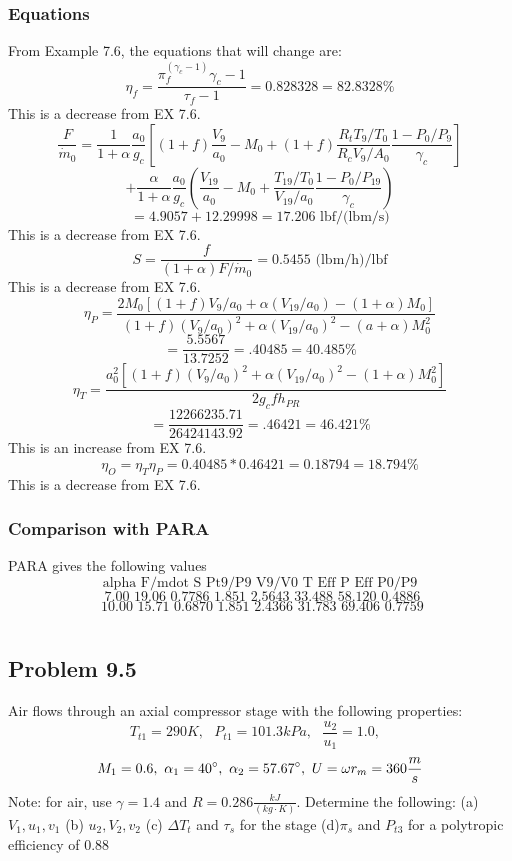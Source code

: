 \documentclass[preview,12pt]{article}
\begin{document}
\subsubsection*{Equations}
From Example 7.6, the equations that will change are: 
$$\eta_f=\frac{\pi_f^{(\gamma_c-1)}{\gamma_c}-1}{\tau_f-1}=\boxed{0.828328=82.8328\%}$$
This is a decrease from EX 7.6.
$$\frac{F}{\dot{m}_0}=\frac{1}{1+\alpha}\frac{a_0}{g_c}\left[(1+f)\frac{V_9}{a_0}-M_0+(1+f)\frac{R_tT_9/T_0}{R_cV_9/A_0}\frac{1-P_0/P_9}{\gamma_c}\right]$$
$$+\frac{\alpha}{1+\alpha}\frac{a_0}{g_c}\left(\frac{V_{19}}{a_0}-M_0+\frac{T_{19}/T_0}{V_{19}/a_0}\frac{1-P_0/P_{19}}{\gamma_c}\right)$$
$$=4.9057+12.29998=\boxed{17.206\textrm{ lbf/(lbm/s)}}$$
This is a decrease from EX 7.6.
$$S=\frac{f}{(1+\alpha)F/\dot{m}_0}=0.5455\textrm{ (lbm/h)/lbf}$$
This is a decrease from EX 7.6.
$$\eta_P=\frac{2M_0[(1+f)V_9/a_0+\alpha(V_{19}/a_0)-(1+\alpha)M_0]}{(1+f)(V_9/a_0)^2+\alpha(V_{19}/a_0)^2-(a+\alpha)M_0^2}$$
$$=\frac{5.5567}{13.7252}=\boxed{.40485=40.485\%}$$
$$\eta_T=\frac{a_0^2[(1+f)(V_9/a_0)^2+\alpha(V_{19}/a_0)^2-(1+\alpha)M_0^2]}{2g_cfh_{PR}}$$
$$=\frac{12266235.71}{26424143.92}=\boxed{.46421=46.421\%}$$
This is an increase from EX 7.6.
$$\eta_O=\eta_T\eta_P=0.40485*0.46421=\boxed{0.18794=18.794\%}$$
This is a decrease from EX 7.6.

\subsubsection*{Comparison with PARA}
PARA gives the following values \newline
$$\textrm{alpha  F/mdot    S   Pt9/P9  V9/V0  T Eff  P Eff  P0/P9}$$
$$\textrm{ 7.00   19.06  0.7786  1.851 2.5643 33.488 58.120 0.4886}$$
$$\textrm{ 10.00  15.71  0.6870  1.851 2.4366 31.783 69.406 0.7759}$$ 

$$$$

\begin{center}
    \section*{Problem 9.5}
\end{center}
Air flows through an axial compressor stage with the following properties:
$$T_{t1}=290 K,\textrm{ } P_{t1} = 101.3 kPa,\textrm{ }\frac{u_2}{u_1}=1.0,\textrm{ } $$
$$M_1=0.6,\textrm{ }\alpha_1=40\degree,\textrm{ } \alpha_2=57.67\degree,\textrm{ } U=\omega r_m=360\frac{m}{s}$$
Note: for air, use $\gamma=1.4$ and $R=0.286 \frac{kJ}{(kg \cdot K)}$.   Determine the following: \newline
(a) $V_1, u_1, v_1$ \newline
(b) $u_2, V_2, v_2$ \newline
(c) $\Delta T_t$ and $\tau_s$ for the stage \newline
(d)$\pi_s$ and $P_{t3}$ for a polytropic efficiency of 0.88
$$$$
\end{document}
